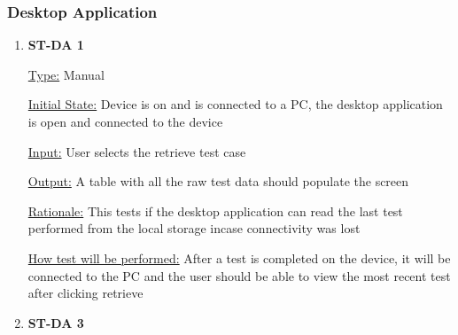 \documentclass[12pt, titlepage]{article}
\begin{document}
\subsubsection{Desktop Application}

\begin{enumerate}
  
  \item{\bf{ST-DA 1}}
  
  \underline{Type:} Manual
            
  \underline{Initial State:} Device is on and is connected to a PC, the desktop application is open and connected to the device
            
  \underline{Input:} User selects the retrieve test case
            
  \underline{Output:} A table with all the raw test data should populate the screen
  
  \underline{Rationale:} This tests if the desktop application can read the last test performed from the local storage incase connectivity was lost 
            
  \underline{How test will be performed:} After a test is completed on the device, it will be connected to the PC and the user should be able to view the most recent test after clicking retrieve\\

  
            
            
            
  
            

  \item{\bf{ST-DA 3}}
  

\end{enumerate}
\end{document}
